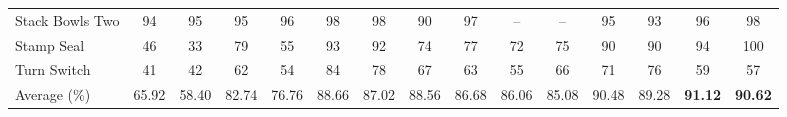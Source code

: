 \begin{table}[tp]
{\begin{tabular}{l*{14}{c}}
        Stack Bowls Two             & 94 & 95 & 95 & 96 & 98 & 98 & 90 & 97 & -- & -- & 95 & 93 & 96 & 98 \\
        Stamp Seal                  & 46 & 33 & 79 & 55 & 93 & 92 & 74 & 77 & 72 & 75 & 90 & 90 & 94 & 100 \\
        Turn Switch                 & 41 & 42 & 62 & 54 & 84 & 78 & 67 & 63 & 55 & 66 & 71 & 76 & 59 & 57 \\
            \midrule
        Average (\%) & 65.92 & 58.40 & 82.74 & 76.76 & 88.66 & 87.02 & 88.56 & 86.68 & 86.06 & 85.08 & 90.48 & 89.28 & \textbf{91.12} & \textbf{90.62} \\
            \bottomrule
        \end{tabular}
    }
\end{table}